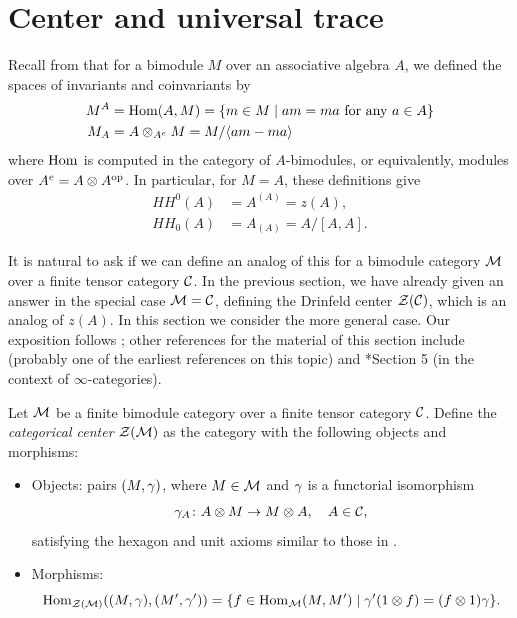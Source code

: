 \section{Center and universal trace}\label{s:cat-trace}
Recall from  that for a bimodule $M$ over an associative
algebra $A$, we defined the spaces of invariants and coinvariants by
\begin{equation}
  \begin{aligned}
    M^{A}&=\operatorname{Hom}(A,M)=\{m\in M\; | \; am=ma \text{ for any } a\in A\}\\
    M_{A}&=A\otimes_{A^e} M = M/\langle am-ma\rangle
  \end{aligned}
\end{equation}
where $\operatorname{Hom}$ is computed in the category of $A$-bimodules, or equivalently,
modules over $A^e=A\otimes A^{\mathrm{op}}$. In particular, for $M=A$, these definitions
give
\begin{align*}
  HH^0(A)&=A^{(A)}=z(A),\\
  HH_0(A)&=A_{(A)}= A/[A,A].
\end{align*}

It is natural to ask if we can define an analog of this for a bimodule category
$\mathcal{M}$ over a finite tensor category $\mathcal{C}$. In the previous section, we have
already given an answer in the special case $\mathcal{M}=\mathcal{C}$, defining the Drinfeld
center $\mathcal{Z}(\mathcal{C})$, which is an analog of $z(A)$. In this section we
consider the more general case. Our exposition follows
; other references for the material of
this section include  (probably one of the earliest references
on this topic) and *{Section 5} (in the context
of $\infty$-categories).

\begin{definition}\label{d:cat-center}
  Let $\mathcal{M}$ be a finite bimodule category over a finite tensor category
  $\mathcal{C}$. Define the \emph{categorical center}
  $\mathcal{Z}(\mathcal{M})$ as the category
  with the following objects and morphisms:
    \begin{itemize}
      \item Objects: pairs $(M, \gamma)$, where $M\in \mathcal{M}$ and $\gamma$ is a
      functorial isomorphism
      $$
        \gamma_A\colon A\otimes M\to M\otimes A, \quad A\in \mathcal{C},
      $$
      satisfying the hexagon and unit axioms similar to those in
      .
      \item Morphisms:
      $$
      \operatorname{Hom}_{\mathcal{Z}(\mathcal{M})}((M, \gamma), (M', \gamma'))
        =\{f \in \operatorname{Hom}_{\mathcal{M}}(M,M')\; | \; \gamma' (1 \otimes f) =(f\otimes 1) \gamma\}.
      $$
    \end{itemize}
  \end{definition}

